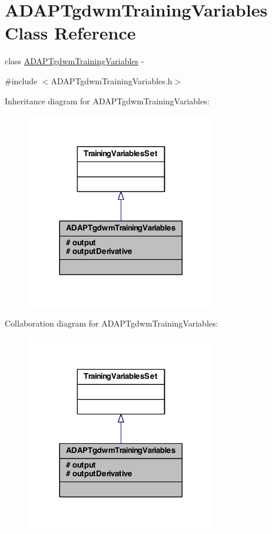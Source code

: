 \hypertarget{class_a_d_a_p_tgdwm_training_variables}{
\section{ADAPTgdwmTrainingVariables Class Reference}
\label{class_a_d_a_p_tgdwm_training_variables}
}


class \hyperlink{class_a_d_a_p_tgdwm_training_variables}{ADAPTgdwmTrainingVariables} -\/  




{\ttfamily \#include $<$ADAPTgdwmTrainingVariables.h$>$}



Inheritance diagram for ADAPTgdwmTrainingVariables:\nopagebreak
\begin{figure}[H]
\begin{center}
\leavevmode
\includegraphics[width=236pt]{class_a_d_a_p_tgdwm_training_variables__inherit__graph}
\end{center}
\end{figure}


Collaboration diagram for ADAPTgdwmTrainingVariables:\nopagebreak
\begin{figure}[H]
\begin{center}
\leavevmode
\includegraphics[width=236pt]{class_a_d_a_p_tgdwm_training_variables__coll__graph}
\end{center}
\end{figure}

